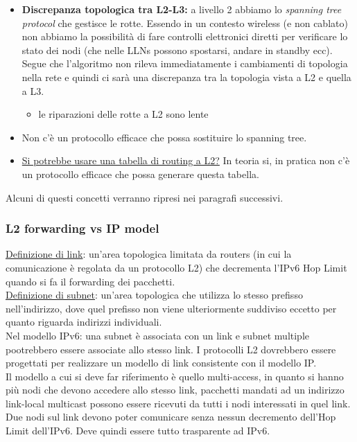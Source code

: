 \documentclass{article}
\begin{document}
\begin{itemize}
    \item \textbf{Discrepanza topologica tra L2-L3:} a livello 2 abbiamo lo \textit{spanning tree protocol} che gestisce le rotte. Essendo in un contesto wireless (e non cablato) non abbiamo la possibilità di fare controlli elettronici diretti per verificare lo stato dei nodi (che nelle LLNs possono spostarsi, andare in standby ecc). Segue che l'algoritmo non rileva immediatamente i cambiamenti di topologia nella rete e quindi ci sarà una discrepanza tra la topologia vista a L2 e quella a L3.
    \begin{itemize}
        \item le riparazioni delle rotte a L2 sono lente
    \end{itemize}
    \item Non c'è un protocollo efficace che possa sostituire lo spanning tree.
    \item \underline{Si potrebbe usare una tabella di routing a L2?} In teoria si, in pratica non c'è un protocollo efficace che possa generare questa tabella.
\end{itemize}
Alcuni di questi concetti verranno ripresi nei paragrafi successivi.
\subsubsection{L2 forwarding vs IP model}
\underline{Definizione di link}: un'area topologica limitata da routers (in cui la comunicazione è regolata da un protocollo L2) che decrementa l'IPv6 Hop Limit quando si fa il forwarding dei pacchetti.\\
\underline{Definizione di subnet}: un'area topologica che utilizza lo stesso prefisso nell'indirizzo, dove quel prefisso non viene ulteriormente suddiviso eccetto per quanto riguarda indirizzi individuali. \\
Nel modello IPv6: una subnet è associata con un link e subnet multiple pootrebbero essere associate allo stesso link. I protocolli L2 dovrebbero essere progettati per realizzare un modello di link consistente con il modello IP. \\
Il modello a cui si deve far riferimento è quello multi-access, in quanto si hanno più nodi che devono accedere allo stesso link, pacchetti mandati ad un indirizzo link-local multicast possono essere ricevuti da tutti i nodi interessati in quel link. Due nodi sul link devono poter comunicare senza nessun decremento dell'Hop Limit dell'IPv6. Deve quindi essere tutto trasparente ad IPv6.
\end{document}
